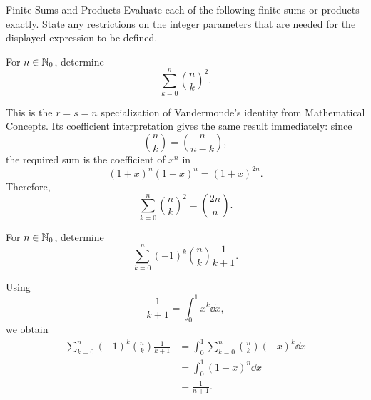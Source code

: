 
    \begin{expectedproblemgroup}{Finite Sums and Products}
        Evaluate each of the following finite sums or products exactly. State any
        restrictions on the integer parameters that are needed for the displayed
        expression to be defined.

        \begin{expectedsubproblem}
            For $n\in\mathbb{N}_0$, determine
            \[
                \sum_{k=0}^{n}\binom{n}{k}^2.
            \]
        \end{expectedsubproblem}

        \begin{expectedsubsolution}
            This is the $r=s=n$ specialization of Vandermonde's identity from
            Mathematical Concepts. Its coefficient interpretation gives the
            same result immediately: since
            \[
                \binom{n}{k}=\binom{n}{n-k},
            \]
            the required sum is the coefficient of $x^n$ in
            \[
                (1+x)^n(1+x)^n=(1+x)^{2n}.
            \]
            Therefore,
            \[
                \boxed{
                    \sum_{k=0}^{n}\binom{n}{k}^2=\binom{2n}{n}
                }.
            \]
        \end{expectedsubsolution}

        \begin{expectedsubproblem}
            For $n\in\mathbb{N}_0$, determine
            \[
                \sum_{k=0}^{n}
                (-1)^k\binom{n}{k}\frac{1}{k+1}.
            \]
        \end{expectedsubproblem}

        \begin{expectedsubsolution}
            Using
            \[
                \frac{1}{k+1}=\int_0^1x^k\dd x,
            \]
            we obtain
            \[
                \begin{aligned}
                    \sum_{k=0}^{n}
                    (-1)^k\binom{n}{k}\frac{1}{k+1}
                    &=
                    \int_0^1
                    \sum_{k=0}^{n}\binom{n}{k}(-x)^k\dd x\\
                    &=
                    \int_0^1(1-x)^n\dd x\\
                    &=
                    \boxed{\frac{1}{n+1}}.
                \end{aligned}
            \]
        \end{expectedsubsolution}


\end{expectedproblemgroup}

